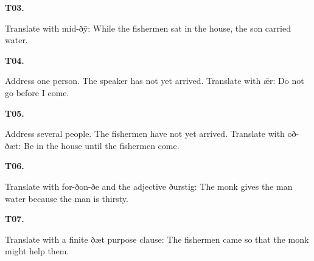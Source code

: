 \par\begin{minipage}{\linewidth}\raggedright
\textbf{T03.}

Translate with mid-ðȳ: While the fishermen sat in the house, the son carried water.

\end{minipage}\par\addvspace{4pt}

\par\begin{minipage}{\linewidth}\raggedright
\textbf{T04.}

Address one person. The speaker has not yet arrived. Translate with ǣr: Do not go before I come.

\end{minipage}\par\addvspace{4pt}

\par\begin{minipage}{\linewidth}\raggedright
\textbf{T05.}

Address several people. The fishermen have not yet arrived. Translate with oð-ðæt: Be in the house until the fishermen come.

\end{minipage}\par\addvspace{4pt}

\par\begin{minipage}{\linewidth}\raggedright
\textbf{T06.}

Translate with for-ðon-ðe and the adjective ðurstig: The monk gives the man water because the man is thirsty.

\end{minipage}\par\addvspace{4pt}

\par\begin{minipage}{\linewidth}\raggedright
\textbf{T07.}

Translate with a finite ðæt purpose clause: The fishermen came so that the monk might help them.

\end{minipage}\par\addvspace{4pt}


